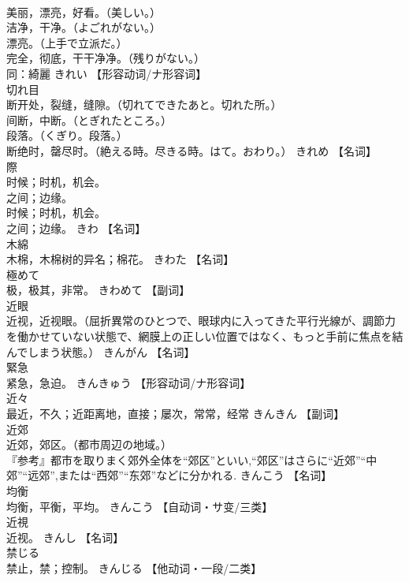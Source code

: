 \documentclass[8pt]{extreport}
\begin{document}
\begin{CJK}{UTF8}{min}
\\	美丽，漂亮，好看。（美しい。） 
\\	洁净，干净。（よごれがない。） 
\\	漂亮。（上手で立派だ。） 
\\	完全，彻底，干干净净。（残りがない。） 
\\	同：綺麗	きれい		【形容动词/ナ形容词】
\\	切れ目	
\\	断开处，裂缝，缝隙。（切れてできたあと。切れた所。） 
\\	间断，中断。（とぎれたところ。） 
\\	段落。（くぎり。段落。） 
\\	断绝时，罄尽时。（絶える時。尽きる時。はて。おわり。）	きれめ		【名词】
\\	際	
\\	时候；时机，机会。 
\\	之间；边缘。 
\\	时候；时机，机会。 
\\	之间；边缘。	きわ		【名词】
\\	木綿	
\\	木棉，木棉树的异名；棉花。	きわた		【名词】
\\	極めて	
\\	极，极其，非常。	きわめて		【副词】
\\	近眼	
\\	近视，近视眼。（屈折異常のひとつで、眼球内に入ってきた平行光線が、調節力を働かせていない状態で、網膜上の正しい位置ではなく、もっと手前に焦点を結んでしまう状態。）	きんがん		【名词】
\\	緊急	
\\	紧急，急迫。	きんきゅう		【形容动词/ナ形容词】
\\	近々	
\\	最近，不久；近距离地，直接；屡次，常常，经常	きんきん		【副词】
\\	近郊	
\\	近郊，郊区。（都市周辺の地域。） 
\\	『参考』都市を取りまく郊外全体を“郊区”といい,“郊区”はさらに“近郊”“中郊”“远郊”,または“西郊”“东郊”などに分かれる.	きんこう		【名词】
\\	均衡	
\\	均衡，平衡，平均。	きんこう		【自动词・サ变/三类】
\\	近視	
\\	近视。	きんし		【名词】
\\	禁じる	
\\	禁止，禁；控制。	きんじる		【他动词・一段/二类】

\end{CJK}
\end{document}
